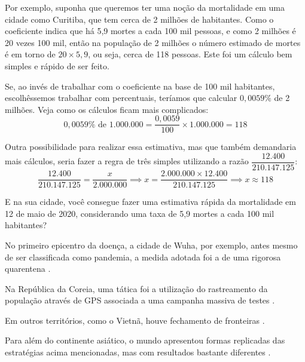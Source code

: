 Por exemplo, suponha que queremos ter uma noção da mortalidade em uma cidade como Curitiba, que tem cerca de 2 milhões de habitantes. Como o coeficiente indica que há 5,9 mortes a cada 100 mil pessoas, e como 2 milhões é 20 vezes 100 mil, então na população de 2 milhões o número estimado de mortes é em torno de $20\times5{,}9$, ou seja, cerca de 118 pessoas. Este foi um cálculo bem simples e rápido de ser feito.

Se, ao invés de trabalhar com o coeficiente na base de 100 mil habitantes, escolhêssemos trabalhar com percentuais, teríamos que calcular $0{,}0059\%$ de 2 milhões. Veja como os cálculos ficam mais complicados:
\begin{equation*}
0{,}0059\%\text{ de }1.000.000=\frac{0{,}0059}{100}\times 1.000.000=118
\end{equation*}

Outra possibilidade para realizar essa estimativa, mas que também demandaria mais cálculos, seria fazer a regra de três simples utilizando a razão $\dfrac{12.400}{210.147.125}$:
\begin{equation*}
\frac{12.400}{210.147.125}=\frac{x}{2.000.000}\implies x=\frac{2.000.000\times 12.400}{210.147.125}\implies x\approx 118
\end{equation*}

E na sua cidade, você consegue fazer uma estimativa rápida da mortalidade em 12 de maio de 2020, considerando uma taxa de 5,9 mortes a cada 100 mil habitantes?


No primeiro epicentro da doença, a cidade de Wuha, por exemplo, antes mesmo de ser classificada como pandemia, a medida adotada foi a de uma rigorosa quarentena \citep{fato2020}.

Na República da Coreia, uma tática foi a utilização do rastreamento da população através de GPS associada a uma campanha massiva de testes \citep{BBC2020a}.

Em outros territórios, como o Vietnã, houve fechamento de fronteiras \citep{marcelino2020}.

Para além do continente asiático, o mundo apresentou formas replicadas das estratégias acima mencionadas, mas com resultados bastante diferentes \citep{BBC2020b}.

